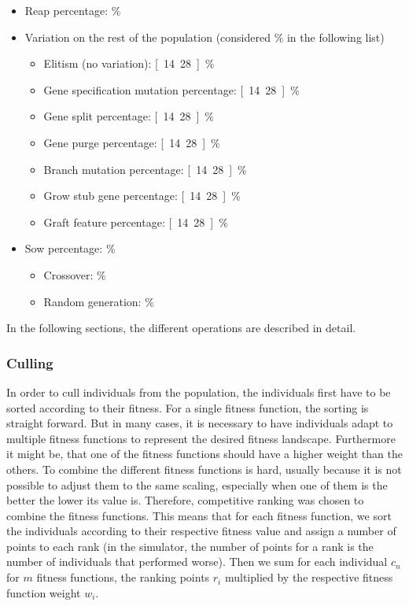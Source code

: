 \documentclass[main]{subfiles}
\begin{document}
\begin{itemize}
\item Reap percentage: \unit[30]{\%}
\item Variation on the rest of the population (considered \unit[100]{\%} in the following list)
\begin{itemize}
\item Elitism (no variation): \unit[14.28]{\%}
\item Gene specification mutation percentage: \unit[14.28]{\%}
\item Gene split percentage: \unit[14.28]{\%}
\item Gene purge percentage: \unit[14.28]{\%}
\item Branch mutation percentage: \unit[14.28]{\%}
\item Grow stub gene percentage: \unit[14.28]{\%}
\item Graft feature percentage: \unit[14.28]{\%}
\end{itemize}
\item Sow percentage: \unit[30]{\%}
\begin{itemize}
\item Crossover: \unit[50]{\%}
\item Random generation: \unit[50]{\%}
\end{itemize}
\label{item:ReaperPerc}
\end{itemize}

In the following sections, the different operations are described in detail.

\subsubsection{Culling}
\label{subsubsection:Culling}

In order to cull individuals from the population, the individuals first have to be sorted according to their fitness. For a single fitness function, the sorting is straight forward. But in many cases, it is necessary to have individuals adapt to multiple fitness functions to represent the desired fitness landscape. Furthermore it might be, that one of the fitness functions should have a higher weight than the others. To combine the different fitness functions is hard, usually because it is not possible to adjust them to the same scaling, especially when one of them is the better the lower its value is. Therefore, competitive ranking was chosen to combine the fitness functions. This means that for each fitness function, we sort the individuals according to their respective fitness value and assign a number of points to each rank (in the simulator, the number of points for a rank is the number of individuals that performed worse). Then we sum for each individual $c_n$ for $m$ fitness functions, the ranking points $r_i$ multiplied by the respective fitness function weight $w_i$. 
\end{document}
